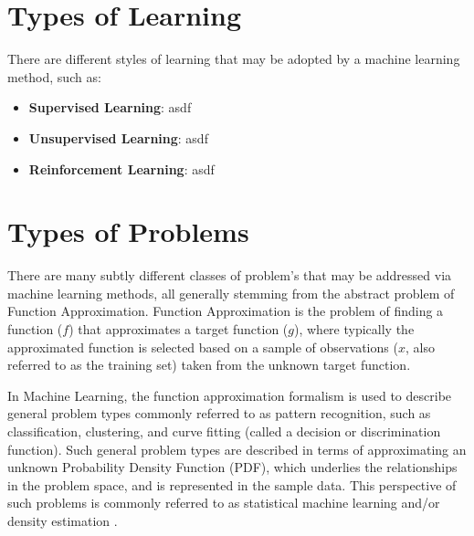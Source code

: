 \documentclass[a4paper, 11pt]{article}
\begin{document}
\section{Types of Learning}
\label{sec:learning}
There are different styles of learning that may be adopted by a machine learning method, such as:

\begin{itemize}
	\item \textbf{Supervised Learning}: asdf
	\item \textbf{Unsupervised Learning}: asdf
	\item \textbf{Reinforcement Learning}: asdf
\end{itemize}

\section{Types of Problems}
\label{sec:problems}
There are many subtly different classes of problem's that may be addressed via machine learning methods, all generally stemming from the abstract problem of Function Approximation. Function Approximation is the problem of finding a function ($f$) that approximates a target function ($g$), where typically the approximated function is selected based on a sample of observations ($x$, also referred to as the training set) taken from the unknown target function.

In Machine Learning, the function approximation formalism is used to describe general problem types commonly referred to as pattern recognition, such as classification, clustering, and curve fitting (called a decision or discrimination function). Such general problem types are described in terms of approximating an unknown Probability Density Function (PDF), which underlies the relationships in the problem space, and is represented in the sample data. This perspective of such problems is commonly referred to as statistical machine learning and/or density estimation \cite{Fukunaga1990, Bishop1995}.
\end{document}
